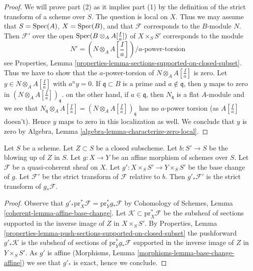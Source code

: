 \begin{proof}
We will prove part (2) as it implies part (1) by the definition of the
strict transform of a scheme over $S$. The question is local on $X$.
Thus we may assume that $S = \mathop{\mathrm{Spec}}(A)$, $X = \mathop{\mathrm{Spec}}(B)$, and that
$\mathcal{F}$ corresponds to the $B$-module $N$. Then $\mathcal{F}'$
over the open $\mathop{\mathrm{Spec}}(B \otimes_A A[\frac{I}{a}])$ of $X \times_S S'$
corresponds to the module
$$
N' = (N \otimes_A A[\textstyle{\frac{I}{a}}])/a\text{-power-torsion}
$$
see Properties, Lemma
\ref{properties-lemma-sections-supported-on-closed-subset}.
Thus we have to show that the $a$-power-torsion of
$N \otimes_A A[\frac{I}{a}]$ is zero. Let $y \in N \otimes_A A[\frac{I}{a}]$
with $a^n y = 0$. If $\mathfrak q \subset B$
is a prime and $a \not \in \mathfrak q$, then $y$ maps to
zero in $(N \otimes_A A[\frac{I}{a}])_\mathfrak q$. on the other hand,
if $a \in \mathfrak q$, then $N_\mathfrak q$ is a flat $A$-module
and we see that
$N_\mathfrak q \otimes_A A[\frac{I}{a}]
=(N \otimes_A A[\frac{I}{a}])_\mathfrak q$
has no $a$-power torsion (as $A[\frac{I}{a}]$ doesn't).
Hence $y$ maps to zero in this localization as well. We conclude that
$y$ is zero by
Algebra, Lemma \ref{algebra-lemma-characterize-zero-local}.
\end{proof}

\begin{lemma}
\label{lemma-strict-transform-affine}
Let $S$ be a scheme. Let $Z \subset S$ be a closed subscheme.
Let $b : S' \to S$ be the blowing up of $Z$ in $S$. Let
$g : X \to Y$ be an affine morphism of schemes over $S$.
Let $\mathcal{F}$ be a quasi-coherent sheaf on $X$.
Let $g' : X \times_S S' \to Y \times_S S'$ be the base change
of $g$. Let $\mathcal{F}'$ be the strict transform of $\mathcal{F}$
relative to $b$. Then $g'_*\mathcal{F}'$ is the strict transform
of $g_*\mathcal{F}$.
\end{lemma}

\begin{proof}
Observe that $g'_*\text{pr}_X^*\mathcal{F} = \text{pr}_Y^*g_*\mathcal{F}$
by Cohomology of Schemes, Lemma \ref{coherent-lemma-affine-base-change}.
Let $\mathcal{K} \subset \text{pr}_X^*\mathcal{F}$ be the subsheaf
of sections supported in the inverse image of $Z$ in $X \times_S S'$.
By Properties, Lemma
\ref{properties-lemma-push-sections-supported-on-closed-subset}
the pushforward $g'_*\mathcal{K}$ is the subsheaf of sections of
$\text{pr}_Y^*g_*\mathcal{F}$ supported in the inverse
image of $Z$ in $Y \times_S S'$. As $g'$ is affine
(Morphisms, Lemma \ref{morphisms-lemma-base-change-affine})
we see that $g'_*$ is exact, hence we conclude.
\end{proof}

